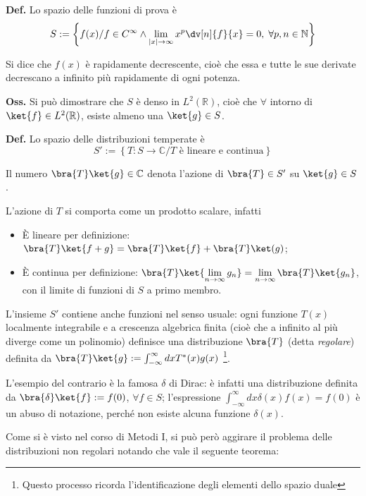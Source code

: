 \textbf{Def.} Lo spazio delle funzioni di prova è
$$ S := \left\{ f(x) / f\in C^{\infty} \land \lim\limits_{|x|\to\infty}
x^p \dv[n]{f}{x}=0,\; \forall p,n\in\mathbb{N}\right\} $$

Si dice che $ f(x) $ è rapidamente decrescente, cioè che essa e tutte le sue derivate
decrescano a infinito più rapidamente di ogni potenza.

\textbf{Oss.} Si può dimostrare che $ S $ è denso in $L^2(\mathbb{R})$, cioè che
$ \forall$ intorno di $\ket{f}\in L^2(\mathbb{R})$, esiste almeno una $\ket{g}\in S$. 

\textbf{Def.} Lo spazio delle distribuzioni temperate è
$$ S':=\left\{ T:S\to\mathbb{C}/T\text{ è lineare e continua} \right\} $$

Il numero $ \bra{T}\ket{g}\in\mathbb{C} $ denota l'azione di $ \bra{T}\in S' $ su $ \ket{g}\in S $.

L'azione di $ T $ si comporta come un prodotto scalare, infatti
\begin{itemize}
    \item È lineare per definizione: $\bra{T}\ket{f+g}=\bra{T}\ket{f} + \bra{T}\ket(g)$;
    \item È continua per definizione: 
	$ \bra{T}\ket{\lim\limits_{n\to\infty}g_n} =\lim\limits_{n\to\infty}
	\bra{T}\ket{g_n} $, con il limite di funzioni di $ S $ a primo membro. 
\end{itemize}


L'insieme $ S' $ contiene anche funzioni nel senso usuale: ogni funzione $ T(x) $ 
localmente integrabile e a crescenza algebrica finita (cioè che a infinito al più
diverge come un polinomio) definisce una distribuzione $ \bra{T} $ (detta
\textit{regolare}) definita da $\bra{T}\ket{g} := \int_{-\infty}^{\infty}dxT^*(x)g(x) $
\footnote{Questo processo ricorda l'identificazione degli elementi dello spazio duale}.

L'esempio del contrario è la famosa $ \delta $ di Dirac: è infatti una distribuzione
definita da $ \bra{\delta}\ket{f}:=f(0)$, $ \forall f\in S $; l'espressione
$ \int_{-\infty}^{\infty}dx\delta(x) f(x) = f(0) $ è un abuso di notazione, perché non 
esiste alcuna funzione $ \delta(x) $.

Come si è visto nel corso di Metodi I, si può però aggirare il problema delle
distribuzioni non regolari notando che vale il seguente teorema:

\noindent{}

